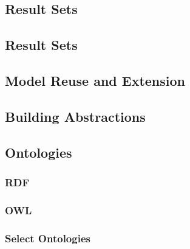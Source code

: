 \subsection{Result Sets}



\subsection{Result Sets}

\subsection{Model Reuse and Extension}



\subsection{Building Abstractions}



\subsection{Ontologies}
\subsubsection{RDF}
\subsubsection{OWL}
\subsubsection{Select Ontologies}

